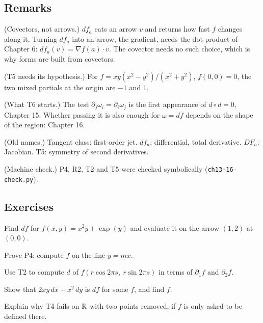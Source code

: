 \subsection*{Remarks}

\begin{lines}
\item[\lab{R1}] (Covectors, not arrows.) $df_a$ eats an arrow $v$ and returns how fast $f$ changes along it. Turning $df_a$ into an arrow, the gradient, needs the dot product of Chapter 6: $df_a(v) = \nabla f(a) \cdot v$. The covector needs no such choice, which is why forms are built from covectors.
\item[\lab{R2}] (T5 needs its hypothesis.) For $f = xy(x^2 - y^2)/(x^2 + y^2)$, $f(0,0) = 0$, the two mixed partials at the origin are $-1$ and $1$.
\item[\lab{R3}] (What T6 starts.) The test $\partial_j \omega_i = \partial_i \omega_j$ is the first appearance of $d \circ d = 0$, Chapter 15. Whether passing it is also enough for $\omega = df$ depends on the shape of the region: Chapter 16.
\item[\lab{R4}] (Old names.) Tangent class: first-order jet. $df_a$: differential, total derivative. $DF_a$: Jacobian. T5: symmetry of second derivatives.
\item[\lab{R5}] (Machine check.) P4, R2, T2 and T5 were checked symbolically (\texttt{ch13-16-check.py}).
\end{lines}

\subsection*{Exercises}

\begin{lines}
\item[\lab{E1}] Find $df$ for $f(x, y) = x^2 y + \exp(y)$ and evaluate it on the arrow $(1, 2)$ at $(0, 0)$.
\item[\lab{E2}] Prove P4: compute $f$ on the line $y = m x$.
\item[\lab{E3}] Use T2 to compute $d$ of $f(r\cos 2\pi s,\ r \sin 2\pi s)$ in terms of $\partial_1 f$ and $\partial_2 f$.
\item[\lab{E4}] Show that $2xy\,dx + x^2\,dy$ is $df$ for some $f$, and find $f$.
\item[\lab{E5}] Explain why T4 fails on $\mathbb{R}$ with two points removed, if $f$ is only asked to be defined there.
\end{lines}

\newpage

